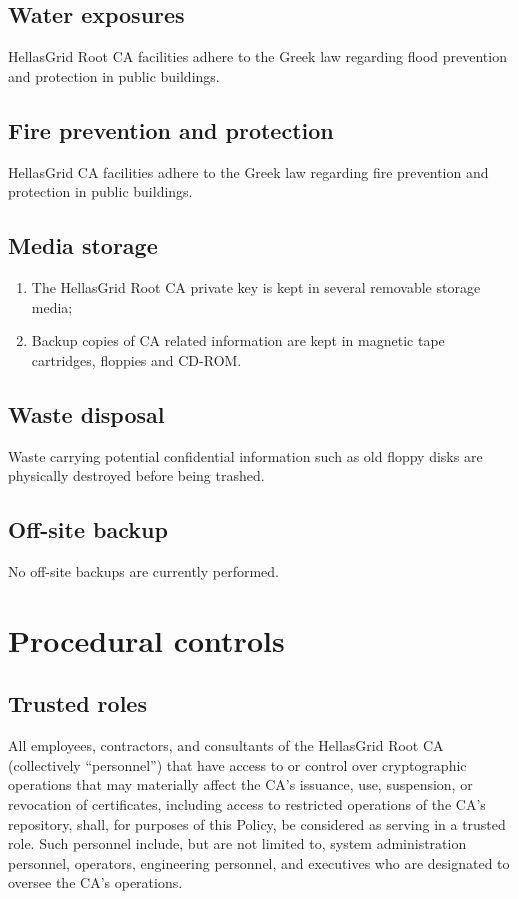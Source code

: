\documentclass[11pt,a4paper,titlepage]{book}
\begin{document}
\subsection{Water exposures}

HellasGrid Root CA facilities adhere to the Greek law regarding flood prevention and protection in public buildings.

\subsection{Fire prevention and protection}

HellasGrid CA facilities adhere to the Greek law regarding fire prevention and protection in public buildings.


\subsection{Media storage}

\begin{enumerate}
\item{The HellasGrid Root CA private key is kept in several removable storage media;}
\item{Backup copies of CA related information are kept in magnetic tape cartridges, floppies and CD-ROM.}
\end{enumerate}

\subsection{Waste disposal}

Waste carrying potential confidential information such as old floppy disks are physically destroyed before being trashed.

\subsection{Off-site backup}

No off-site backups are currently performed.

\section{Procedural controls}
\subsection{Trusted roles}

All employees, contractors, and consultants of the HellasGrid Root CA (collectively “personnel”) that have access to or control over cryptographic operations that may materially affect the CA’s issuance, use, suspension, or revocation of certificates, including access to restricted operations of the CA’s repository, shall, for purposes of this Policy, be considered as serving in a trusted role. Such personnel include, but are not limited to, system administration personnel, operators, engineering personnel, and executives who are designated to oversee the CA’s operations.
\end{document}
